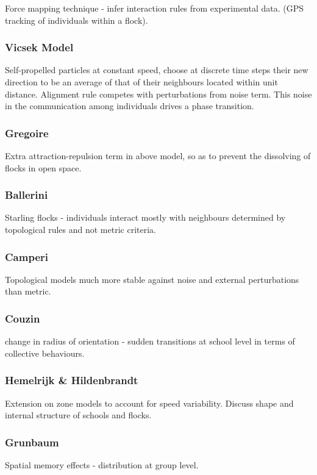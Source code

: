 \documentclass[10pt,twocolumn]{revtex4-2}    %
\begin{document}
Force mapping technique - infer interaction rules from experimental data. (GPS tracking of individuals within a flock).

\subsubsection{Vicsek Model} \cite{Vicsek1995}
Self-propelled particles at constant speed, choose at discrete time steps their new direction to be an average of that of their neighbours located within unit distance. Alignment rule competes with perturbations from noise term. This noise in the communication among individuals drives a phase transition.

\subsubsection{Gregoire} \cite{GREGOIRE2003}
Extra attraction-repulsion term in above model, so as to prevent the dissolving of flocks in open space.

\subsubsection{Ballerini} \cite{BALLERINI2008}
Starling flocks - individuals interact mostly with neighbours determined by topological rules and not metric criteria.

\subsubsection{Camperi} \cite{Camperi2012}
Topological models much more stable against noise and external perturbations than metric.

\subsubsection{Couzin} \cite{Couzin2005}
change in radius of orientation - sudden transitions at school level in terms of collective behaviours. 

\subsubsection{Hemelrijk \& Hildenbrandt}
Extension on zone models to account for speed variability. Discuss shape and internal structure of schools and flocks.

\subsubsection{Grunbaum}
Spatial memory effects - distribution at group level.
\end{document}
